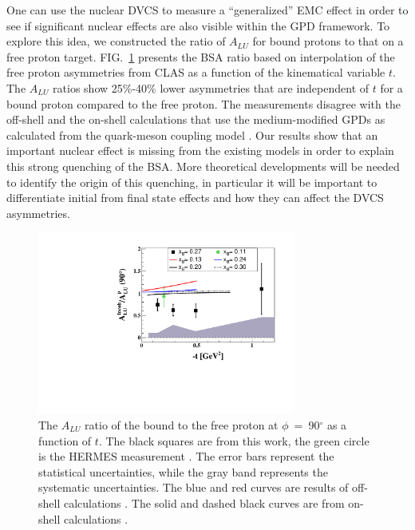 \documentclass[twocolumn,nofootinbib,showpacs,prl,superscriptaddress,secnumarabic,amssymb,nobibnotes,aps,floatfix]{revtex4}
\begin{document}
One can use the nuclear DVCS to measure a ``generalized'' EMC effect in order 
to see if significant nuclear effects are also visible within the GPD 
framework. To explore this idea, we constructed the ratio of $A_{LU}$ for bound 
protons to that on a free proton target.  
FIG.~\ref{fig:incoh_EMC_ratio_ALU_proton} presents the BSA ratio based on 
interpolation of the free proton asymmetries from CLAS \cite{Girod:2007aa} as a 
function of the kinematical variable $t$. The $A_{LU}$ ratios show 25\%-40\% 
lower asymmetries that are independent of $t$ for a bound proton compared to 
the free proton. The measurements disagree with the off-shell 
\cite{simonetta_2} and the on-shell calculations that use the medium-modified 
GPDs as calculated from the quark-meson coupling model \cite{Guzey:2008fe}. Our 
results show that an important nuclear effect is missing from the existing 
models in order to explain this strong quenching of the BSA. More theoretical 
developments will be needed to identify the origin of this quenching, in 
particular it will be important to differentiate initial from final state 
effects and how they can affect the DVCS asymmetries.

\begin{figure}[tb]
\centering
\includegraphics[width=8.5cm]{figs/ALU_ratioInc_t_shortscenrario-without-error-onX.pdf}
\caption{ The $A_{LU}$ ratio of the bound to the free proton at 
   $\phi$~=~90$^{\circ}$ as a function of $t$. The black squares are from this 
   work, the green circle is the HERMES measurement \cite{Airapetian:2009cga}.  
   The error bars represent the statistical uncertainties, while the gray band 
   represents the systematic uncertainties. The blue and red curves are results 
   of off-shell calculations \cite{simonetta_2}. The solid and dashed black 
   curves are from on-shell calculations \cite{Guzey:2008fe}.} 
   \label{fig:incoh_EMC_ratio_ALU_proton}
\end{figure}
\end{document}

